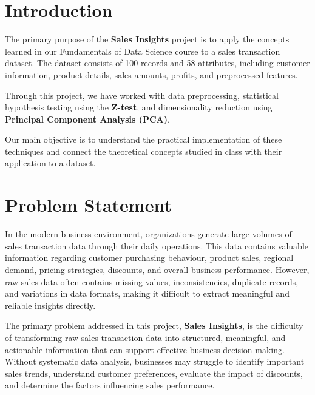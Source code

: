 \documentclass[12pt,a4paper]{report}
\begin{document}

\tableofcontents
\newpage



\chapter{Introduction}

\begingroup
\fontsize{14}{21}\selectfont

The primary purpose of the \textbf{Sales Insights}
project is to apply the concepts learned in our
Fundamentals of Data Science course to a sales
transaction dataset. The dataset consists of
100 records and 58 attributes, including
customer information, product details, sales
amounts, profits, and preprocessed features.

Through this project, we have worked with
data preprocessing, statistical hypothesis
testing using the \textbf{Z-test}, and
dimensionality reduction using
\textbf{Principal Component Analysis (PCA)}.

Our main objective is to understand the
practical implementation of these techniques
and connect the theoretical concepts studied
in class with their application to a dataset.

\endgroup

\chapter{Problem Statement}

\begingroup
\fontsize{14}{21}\selectfont
\justifying

In the modern business environment, organizations generate
large volumes of sales transaction data through their
daily operations. This data contains valuable information
regarding customer purchasing behaviour, product sales,
regional demand, pricing strategies, discounts, and
overall business performance. However, raw sales data
often contains missing values, inconsistencies, duplicate
records, and variations in data formats, making it
difficult to extract meaningful and reliable insights
directly.

The primary problem addressed in this project,
\textbf{Sales Insights}, is the difficulty of transforming
raw sales transaction data into structured, meaningful,
and actionable information that can support effective
business decision-making. Without systematic data
analysis, businesses may struggle to identify important
sales trends, understand customer preferences, evaluate
the impact of discounts, and determine the factors
influencing sales performance.
\end{document}
